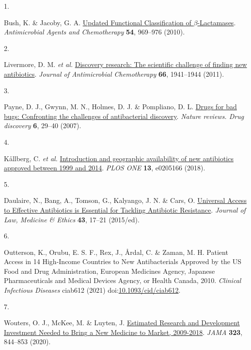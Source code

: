 \documentclass[
]{book}
\newlength{\cslhangindent}
\newlength{\csllabelwidth}
\newlength{\cslentryspacingunit} %
\newenvironment{CSLReferences}[2] %
 {%
  \setlength{\parindent}{0pt}
  \ifodd #1
  \let\oldpar\par
  \def\par{\hangindent=\cslhangindent\oldpar}
  \fi
  \setlength{\parskip}{#2\cslentryspacingunit}
 }%
 {}
\newcommand{\CSLLeftMargin}[1]{\parbox[t]{\csllabelwidth}{#1}}
\newcommand{\CSLRightInline}[1]{\parbox[t]{\linewidth - \csllabelwidth}{#1}\break}
\begin{document}
\hypertarget{refs}{}
\begin{CSLReferences}{0}{0}
\leavevmode{}%
\CSLLeftMargin{1. }
\CSLRightInline{Bush, K. \& Jacoby, G. A. \href{https://doi.org/10.1128/AAC.01009-09}{Updated {Functional Classification} of {\(\beta\)}-{Lactamases}}. \emph{Antimicrobial Agents and Chemotherapy} \textbf{54}, 969--976 (2010).}

\leavevmode{}%
\CSLLeftMargin{2. }
\CSLRightInline{Livermore, D. M. \emph{et al.} \href{https://doi.org/10.1093/jac/dkr262}{Discovery research: The scientific challenge of finding new antibiotics}. \emph{Journal of Antimicrobial Chemotherapy} \textbf{66}, 1941--1944 (2011).}

\leavevmode{}%
\CSLLeftMargin{3. }
\CSLRightInline{Payne, D. J., Gwynn, M. N., Holmes, D. J. \& Pompliano, D. L. \href{https://doi.org/10.1038/nrd2201}{Drugs for bad bugs: Confronting the challenges of antibacterial discovery}. \emph{Nature reviews. Drug discovery} \textbf{6}, 29--40 (2007).}

\leavevmode{}%
\CSLLeftMargin{4. }
\CSLRightInline{Kållberg, C. \emph{et al.} \href{https://doi.org/10.1371/journal.pone.0205166}{Introduction and geographic availability of new antibiotics approved between 1999 and 2014}. \emph{PLOS ONE} \textbf{13}, e0205166 (2018).}

\leavevmode{}%
\CSLLeftMargin{5. }
\CSLRightInline{Daulaire, N., Bang, A., Tomson, G., Kalyango, J. N. \& Cars, O. \href{https://doi.org/10.1111/jlme.12269}{Universal {Access} to {Effective Antibiotics} is {Essential} for {Tackling Antibiotic Resistance}}. \emph{Journal of Law, Medicine \& Ethics} \textbf{43}, 17--21 (2015/ed).}

\leavevmode{}%
\CSLLeftMargin{6. }
\CSLRightInline{Outterson, K., Orubu, E. S. F., Rex, J., Årdal, C. \& Zaman, M. H. Patient {Access} in 14 {High-Income Countries} to {New Antibacterials Approved} by the {US Food} and {Drug Administration}, {European Medicines Agency}, {Japanese Pharmaceuticals} and {Medical Devices Agency}, or {Health Canada}, 2010\textendash 2020. \emph{Clinical Infectious Diseases} ciab612 (2021) doi:\href{https://doi.org/10.1093/cid/ciab612}{10.1093/cid/ciab612}.}

\leavevmode{}%
\CSLLeftMargin{7. }
\CSLRightInline{Wouters, O. J., McKee, M. \& Luyten, J. \href{https://doi.org/10.1001/jama.2020.1166}{Estimated {Research} and {Development Investment Needed} to {Bring} a {New Medicine} to {Market}, 2009-2018}. \emph{JAMA} \textbf{323}, 844--853 (2020).}


\end{CSLReferences}
\end{document}
